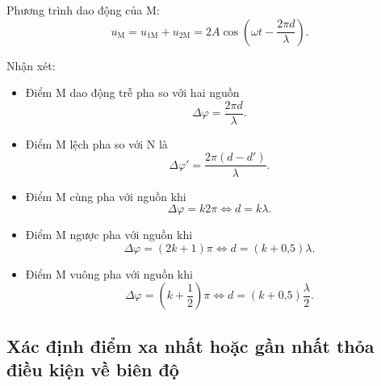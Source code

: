 Phương trình dao động của M:
\begin{equation*}
	u_{\text{M}}= u_{\text{1M}}+u_{\text{2M}}=2A \cos \left(\omega  t - \dfrac{2\pi d}{\lambda} \right).
\end{equation*}

Nhận xét:

\begin{itemize}
	\item Điểm M dao động trễ pha so với hai nguồn
	\begin{equation*}
		\Delta \varphi =\dfrac{2\pi d}{\lambda}.
	\end{equation*}
	\item Điểm M lệch pha so với N là 
	\begin{equation*}
		\Delta \varphi' =\dfrac{2\pi (d-d')}{\lambda}.
	\end{equation*}
	\item Điểm M cùng pha với nguồn khi 
	\begin{equation*}
		\Delta \varphi=k2\pi\Leftrightarrow d=k\lambda.
	\end{equation*}
	\item Điểm M ngược pha với nguồn khi 
	\begin{equation*}
		\Delta \varphi=(2k+1)\pi\Leftrightarrow d=(k + \text{0,5})\lambda.
	\end{equation*}
	\item Điểm M vuông pha với nguồn khi
	\begin{equation*}
		\Delta \varphi=\left(k+\dfrac{1}{2}\right)\pi\Leftrightarrow  d=(k+ \text{0,5})\dfrac{\lambda}{2}.
	\end{equation*}
\end{itemize}
\subsection{Xác định điểm xa nhất hoặc gần nhất thỏa điều kiện về biên độ}
